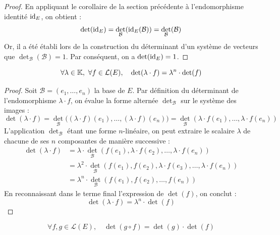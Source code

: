 \documentclass[12pt, a4paper]{report}
\begin{document}
\begin{proof}
    En appliquant le corollaire de la section précédente à l'endomorphisme identité $\mathrm{id}_E$, on obtient :
    $$\det(\mathrm{id}_E) = \det_{\mathcal{B}}(\mathrm{id}_E(\mathcal{B})) = \det_{\mathcal{B}}(\mathcal{B})$$
    Or, il a été établi lors de la construction du déterminant d'un système de vecteurs que $\det_{\mathcal{B}}(\mathcal{B}) = 1$.
    Par conséquent, on a $\det(\mathrm{id}_E) = 1$.
\end{proof}

\begin{property}
    $$\forall \lambda \in \mathbb{K}, \ \forall f \in \mathcal{L}(E), \quad \det(\lambda \cdot f) = \lambda^n \cdot \det(f)$$
\end{property}

\begin{proof}
    Soit $\mathcal{B} = (e_1, \dots, e_n)$ la base de $E$. Par définition du déterminant de l'endomorphisme $\lambda \cdot f$, on évalue la forme alternée $\det_{\mathcal{B}}$ sur le système des images :
    $$\det(\lambda \cdot f) = \det_{\mathcal{B}}\bigl((\lambda \cdot f)(e_1), \dots, (\lambda \cdot f)(e_n)\bigr) = \det_{\mathcal{B}}(\lambda \cdot f(e_1), \dots, \lambda \cdot f(e_n))$$
    L'application $\det_{\mathcal{B}}$ étant une forme $n$-linéaire, on peut extraire le scalaire $\lambda$ de chacune de ses $n$ composantes de manière successive :
    \begin{align*}
        \det(\lambda \cdot f) &= \lambda \cdot \det_{\mathcal{B}}(f(e_1), \lambda \cdot f(e_2), \dots, \lambda \cdot f(e_n)) \\
        &= \lambda^2 \cdot \det_{\mathcal{B}}(f(e_1), f(e_2), \lambda \cdot f(e_3), \dots, \lambda \cdot f(e_n)) \\
        &= \lambda^n \cdot \det_{\mathcal{B}}(f(e_1), f(e_2), \dots, f(e_n))
    \end{align*}
    En reconnaissant dans le terme final l'expression de $\det(f)$, on conclut :
    $$\det(\lambda \cdot f) = \lambda^n \cdot \det(f)$$
\end{proof}

\begin{property}
    $$\forall f, g \in \mathcal{L}(E), \quad \det(g \circ f) = \det(g) \cdot \det(f)$$
\end{property}
\end{document}
